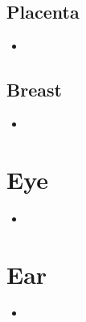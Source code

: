 \subsection{Placenta}
\begin{center}
\end{center}
\begin{itemize}
  \item 
\end{itemize}

\subsection{Breast}
\begin{center}
\end{center}
\begin{itemize}
  \item 
\end{itemize}

\section{Eye}
\begin{center}
\end{center}
\begin{itemize}
  \item 
\end{itemize}

\section{Ear}
\begin{center}
\end{center}
\begin{itemize}
  \item 
\end{itemize}

